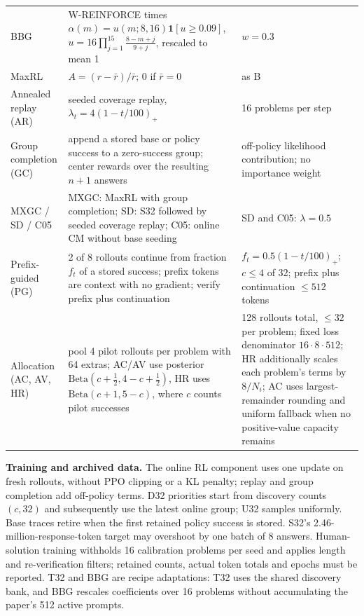 \documentclass[11pt]{article}
\begin{document}
\begin{longtable}{@{}P{3.0cm}P{6.2cm}P{4.6cm}@{}}
BBG & W-REINFORCE times $\alpha(m)=u(m;8,16)\mathbf 1[u\ge0.09]$, $u=16\prod_{j=1}^{15}\frac{8-m+j}{9+j}$, rescaled to mean 1 & $w=0.3$\\
MaxRL & $A=(r-\bar r)/\bar r$; 0 if $\bar r=0$ & as B\\
Annealed replay (AR) & seeded coverage replay, $\lambda_t=4(1-t/100)_+$ & 16 problems per step\\
Group completion (GC) & append a stored base or policy success to a zero-success group; center rewards over the resulting $n+1$ answers & off-policy likelihood contribution; no importance weight\\
MXGC / SD / C05 & MXGC: MaxRL with group completion; SD: S32 followed by seeded coverage replay; C05: online CM without base seeding & SD and C05: $\lambda=0.5$\\
Prefix-guided (PG) & 2 of 8 rollouts continue from fraction $f_t$ of a stored success; prefix tokens are context with no gradient; verify prefix plus continuation & $f_t=0.5(1-t/100)_+$; $c\le4$ of 32; prefix plus continuation $\le512$ tokens\\
Allocation (AC, AV, HR) & pool 4 pilot rollouts per problem with 64 extras; AC/AV use posterior $\mathrm{Beta}(c+\frac12,4-c+\frac12)$, HR uses $\mathrm{Beta}(c+1,5-c)$, where $c$ counts pilot successes & 128 rollouts total, $\le32$ per problem; fixed loss denominator $16\cdot8\cdot512$; HR additionally scales each problem's terms by $8/N_i$; AC uses largest-remainder rounding and uniform fallback when no positive-value capacity remains\\
\bottomrule
\end{longtable}
\normalsize
\textbf{Training and archived data.} The online RL component uses one update on fresh rollouts, without PPO clipping or a KL penalty; replay and group completion add off-policy terms. D32 priorities start from discovery counts $(c,32)$ and subsequently use the latest online group; U32 samples uniformly. Base traces retire when the first retained policy success is stored. S32's 2.46-million-response-token target may overshoot by one batch of 8 answers. Human-solution training withholds 16 calibration problems per seed and applies length and re-verification filters; retained counts, actual token totals and epochs must be reported. T32 and BBG are recipe adaptations: T32 uses the shared discovery bank, and BBG rescales coefficients over 16 problems without accumulating the paper's 512 active prompts.
\end{document}
